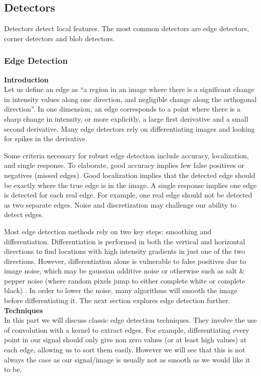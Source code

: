 \documentclass[twoside]{article}
\begin{document}
\subsection{Detectors}
Detectors detect local features. The most common detectors are edge detectors, corner detectors and blob detectors.
\subsubsection{Edge Detection}
\textbf{Introduction}\\
Let us define an edge as ``a region in an image where there is a significant change in intensity values along one direction, and negligible change along the orthogonal direction''. In one dimension, an edge corresponds to a point where there is a sharp change in intensity, or more explicitly, a large first derivative and a small second derivative. Many edge detectors rely on differentiating images and looking for spikes in the derivative.

Some criteria necessary for robust edge detection include accuracy, localization, and single response. To elaborate, good accuracy implies few false positives or negatives (missed edges). Good localization implies that the detected edge should be exactly where the true edge is in the image. A single response implies one edge is detected for each real edge. For example, one real edge should not be detected as two separate edges. Noise and discretization may challenge our ability to detect edges.

Most edge detection methods rely on two key steps: smoothing and differentiation. Differentiation is performed in both the vertical and horizontal directions to find locations with high intensity gradients in just one of the two directions. However, differentiation alone is vulnerable to false positives due to image noise, which may be gaussian additive noise or otherwise such as salt \& pepper noise (where random pixels jump to either complete white or complete black) \cite{saltnpepper}. In order to lower the noise, many algorithms will smooth the image before differentiating it. The next section explores edge detection further. \\

\textbf{Techniques}\\
In this part we will discuss classic edge detection techniques. They involve the use of convolution with a kernel to extract edges. For example, differentiating every point in our signal should only give non zero values (or at least high values) at each edge, allowing us to sort them easily. However we will see that this is not always the case as our signal/image is usually not as smooth as we would like it to be.
\end{document}
